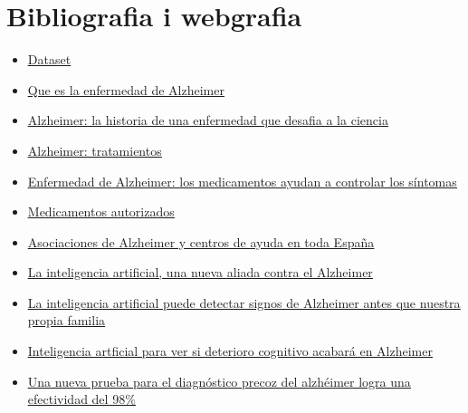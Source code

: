 \documentclass[a4paper,12pt]{article}
\begin{document}
\section*{Bibliografia i webgrafia}
\begin{itemize}
    \item \href{https://www.kaggle.com/datasets/uraninjo/augmented-alzheimer-mri-dataset?resource=download}{\underline{Dataset}}
    \item \href{https://www.alz.org/alzheimer-demencia/que-es-la-enfermedad-de-alzheimer }{\underline{Que es la enfermedad de Alzheimer}}
    \item \href{https://www.caeme.org.ar/alzheimer-la-historia-de-una-enfermedad-que-desafia-a-la-ciencia/}{\underline{Alzheimer: la historia de una enfermedad que desafia a la ciencia }}
    \item \href{https://www.alz.org/alzheimer-demencia/tratamientos}{\underline{Alzheimer: tratamientos}}
    \item \href{https://www.mayoclinic.org/es-es/diseases-conditions/alzheimers-disease/in-depth/alzheimers/art-20048103}{\underline{Enfermedad de Alzheimer: los medicamentos ayudan a controlar los síntomas}}
    \item \href{http://www.alzfae.org/fundacion/549/medicamentos-autorizados}{\underline{Medicamentos autorizados}}
    \item \href{https://aiudo.es/asociaciones-de-alzheimer-y-centros/#asociaciones-de-alzheimer}{\underline{Asociaciones de Alzheimer y centros de ayuda en toda España}}
    \item \href{https://neurohouse.es/espacio-reimagine/la-inteligencia-artificial-una-nueva-aliada-contra-el-alzheimer}{\underline{La inteligencia artificial, una nueva aliada contra el Alzheimer}}
    \item \href{https://www.aecoc.es/innovation-hub-noticias/la-inteligencia-artificial-puede-detectar-signos-de-alzheimer-antes-que-nuestra-propia-familia/}{\underline{La inteligencia artificial puede detectar signos de Alzheimer antes que nuestra propia familia}}
    \item \href{https://www.lavanguardia.com/vida/20220427/8225520/inteligencia-artificial-ver-deterioro-cognitivo-acabara-alzheimer.html}{\underline{Inteligencia artficial para ver si deterioro cognitivo acabará en Alzheimer}}
    \item \href{https://www.larazon.es/sociedad/20220620/ajwe2fywxzgnta7zt4godk4bae.html}{\underline{Una nueva prueba para el diagnóstico precoz del alzhéimer logra una efectividad del 98\%}}

\end{itemize}
\end{document}
